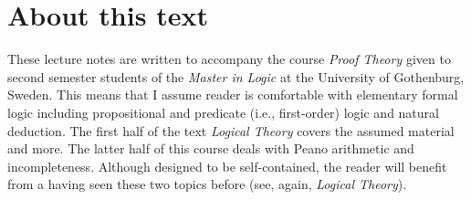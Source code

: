 \chapter{About this text}
\label{c-about}
%
These lecture notes are written to accompany the course \emph{Proof Theory} given to second semester students of the \emph{Master in Logic} at the University of Gothenburg, Sweden.
This means that I assume reader is comfortable with elementary formal logic including propositional and predicate (i.e., first-order) logic and natural deduction.
The first half of the text \emph{Logical Theory} covers the assumed material and more.
The latter half of this course deals with Peano arithmetic and incompleteness.
Although designed to be self-contained, the reader will benefit from a having seen these two topics before (see, again, \emph{Logical Theory}).

\nocite{LogThe}